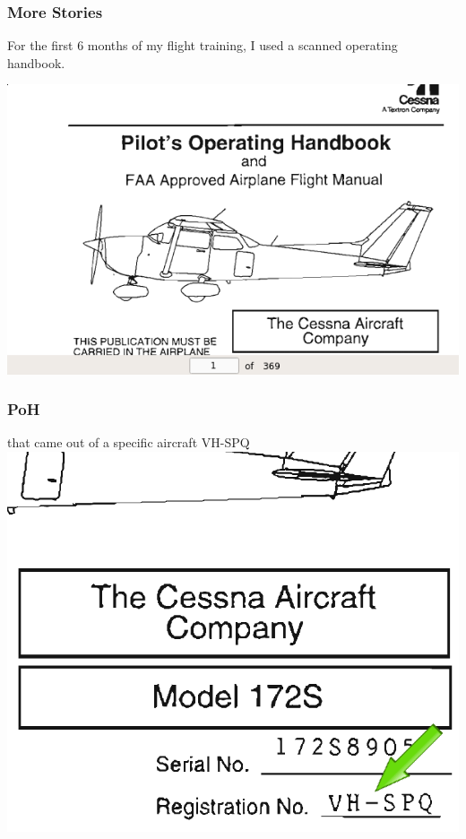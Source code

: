\begin{frame}
\frametitle{More Stories}
\begin{center}
For the first 6 months of my flight training, I used a scanned operating handbook.
\par
\includegraphics[height=0.5\textheight]{image/scanned-poh.png}
\end{center}
\end{frame}

\begin{frame}
\frametitle{PoH}
\begin{center}
that came out of a specific aircraft VH-SPQ
\includegraphics[height=0.5\textheight]{image/scanned-poh-registration.png}
\end{center}
\end{frame}

